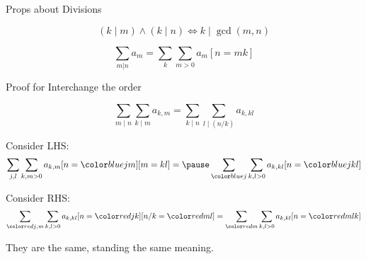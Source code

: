\begin{frame}{Props about Divisions}

    \begin{theorem}
        $$
        (k\mid m) \wedge (k\mid n) \Leftrightarrow k\mid \operatorname{gcd}(m, n)
        $$
    \end{theorem}
    $$
    \sum_{m | n} a_m=\sum_k \sum_{m>0} a_m[n=m k]
    $$


    
\end{frame}

\begin{frame}{Proof for Interchange the order}
    \begin{theorem}
    $$
    \sum_{m \mid n} \sum_{k \mid m} a_{k, m}=\sum_{k \mid n} \sum_{l \mid(n / k)} a_{k, k l}
    $$
\end{theorem}

    Consider LHS: \pause
    $$
    \sum_{j, l} \sum_{{k}, m>0} a_{ k, m}[n=\blue{j} m][m={k} l]=\pause \sum_{\blue j} \sum_{k, {l}>0} a_{k, k {l}}[n=\blue{j} k l]
    $$ \pause 

    Consider RHS: \pause 
    $$
    \sum_{\red j, m} \sum_{k, l>0} a_{k, k l}[n=\red{j} k][n / k=\red m l]=\sum_{\red m} \sum_{k, l>0} a_{k, k l}[n=\red m l k]
    $$

    They are the same, standing the same meaning. 
    
\end{frame}

